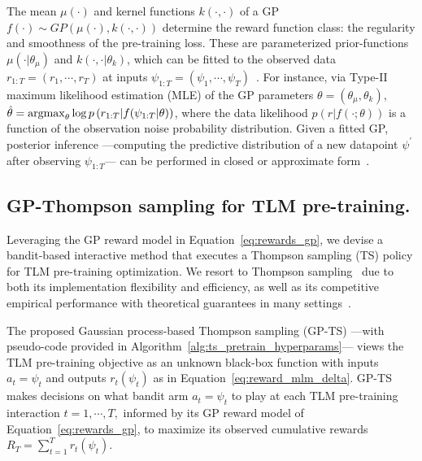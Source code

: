 The mean $\mu(\cdot)$ and kernel functions $k(\cdot,\cdot)$ of a GP $f(\cdot) \sim GP(\mu(\cdot), k(\cdot,\cdot))$ determine the reward function class:
\ie the regularity and smoothness of the pre-training loss.
These are parameterized prior-functions $\mu(\cdot|\theta_{\mu})$ and $k(\cdot, \cdot|\theta_k)$,
which can be fitted to the observed data $r_{1:T} = (r_1, \cdots, r_T)$ at inputs $\psi_{1:T} = (\psi_1, \cdots, \psi_T)$~\citep{b-Rasmussen2005}.
For instance, via Type-II maximum likelihood estimation (MLE) of the GP parameters $\theta=(\theta_{\mu}, \theta_k)$,
$
\hat{\theta} =\argmax_{\theta} \log p\left(r_{1:T}|f(\psi_{1:T} | \theta) \right) %
$,
where the data likelihood $p(r|f (\cdot; \theta))$ is a function of the observation noise probability distribution.
%
Given a fitted GP, posterior inference
---computing the predictive distribution of a new datapoint $\psi^\prime$ after observing $\psi_{1:T}$---
can be performed in closed or approximate form~\cite{ip-Titsias2009,ip-Flaxman2015,ip-Pleiss2018}.

\subsection{GP-Thompson sampling for TLM pre-training.}
\label{ssec:method_gpts}
Leveraging the GP reward model in Equation~\eqref{eq:rewards_gp},
we devise a bandit-based interactive method that executes a Thompson sampling (TS) policy
for TLM pre-training optimization.
We resort to Thompson sampling~\cite{j-Russo2018} due to both its implementation flexibility and efficiency,
as well as its competitive empirical performance with theoretical guarantees in many settings~\cite{ip-Agrawal2013,ip-Krause2011,ip-Nguyen2020,ip-Srinivas2010}.

The proposed Gaussian process-based Thompson sampling (GP-TS)
---with pseudo-code provided in Algorithm~\ref{alg:ts_pretrain_hyperparams}---
views the TLM pre-training objective as an unknown black-box function with inputs $a_t=\psi_t$ and outputs $r_t(\psi_t)$ as in Equation~\eqref{eq:reward_mlm_delta}.
%
GP-TS makes decisions on what bandit arm $a_t=\psi_t$ to play at each TLM pre-training interaction $t=1,\cdots,T,$
informed by its GP reward model of Equation~\eqref{eq:rewards_gp}, 
to maximize its observed cumulative rewards $R_T=\sum_{t=1}^T r_{t}(\psi_t)$.

